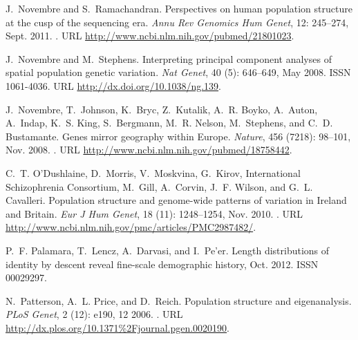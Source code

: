 \documentclass{article}
\begin{document}
\begin{thebibliography}{76}
J.~Novembre and S.~Ramachandran.
\newblock Perspectives on human population structure at the cusp of the
  sequencing era.
\newblock \emph{Annu Rev Genomics Hum Genet}, 12: 245--274, Sept.
  2011.
\newblock {}.
\newblock URL \url{http://www.ncbi.nlm.nih.gov/pubmed/21801023}.

J.~Novembre and M.~Stephens.
\newblock Interpreting principal component analyses of spatial population
  genetic variation.
\newblock \emph{Nat Genet}, 40 (5): 646--649, May 2008.
\newblock ISSN 1061-4036.
\newblock URL \url{http://dx.doi.org/10.1038/ng.139}.

J.~Novembre, T.~Johnson, K.~Bryc, Z.~Kutalik, A.~R. Boyko, A.~Auton, A.~Indap,
  K.~S. King, S.~Bergmann, M.~R. Nelson, M.~Stephens, and C.~D. Bustamante.
\newblock Genes mirror geography within {Europe}.
\newblock \emph{Nature}, 456 (7218): 98--101, Nov. 2008.
\newblock {}.
\newblock URL \url{http://www.ncbi.nlm.nih.gov/pubmed/18758442}.

C.~T. O'Dushlaine, D.~Morris, V.~Moskvina, G.~Kirov, {International
  Schizophrenia Consortium}, M.~Gill, A.~Corvin, J.~F. Wilson, and G.~L.
  Cavalleri.
\newblock Population structure and genome-wide patterns of variation in
  {Ireland} and {Britain}.
\newblock \emph{Eur J Hum Genet}, 18 (11): 1248--1254, Nov.
  2010.
\newblock {}.
\newblock URL \url{http://www.ncbi.nlm.nih.gov/pmc/articles/PMC2987482/}.

P.~F. Palamara, T.~Lencz, A.~Darvasi, and I.~Pe'er.
\newblock Length distributions of identity by descent reveal fine-scale
  demographic history, Oct. 2012.
\newblock ISSN 00029297.

N.~Patterson, A.~L. Price, and D.~Reich.
\newblock Population structure and eigenanalysis.
\newblock \emph{PLoS Genet}, 2 (12): e190, 12 2006.
\newblock {}.
\newblock URL \url{http://dx.plos.org/10.1371%2Fjournal.pgen.0020190}.


\end{thebibliography}
\end{document}
